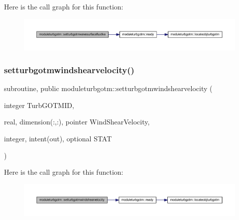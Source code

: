 Here is the call graph for this function\+:\nopagebreak
\begin{figure}[H]
\begin{center}
\leavevmode
\includegraphics[width=350pt]{namespacemoduleturbgotm_a868b912c54f8467afdf5608913e56f87_cgraph}
\end{center}
\end{figure}
\mbox{\label{namespacemoduleturbgotm_acbaf0e58ab0ad4a29aca5101ed59bdea}} 
\subsubsection{\texorpdfstring{setturbgotmwindshearvelocity()}{setturbgotmwindshearvelocity()}}
{\footnotesize\ttfamily subroutine, public moduleturbgotm\+::setturbgotmwindshearvelocity (\begin{DoxyParamCaption}\item[{integer}]{Turb\+G\+O\+T\+M\+ID,  }\item[{real, dimension(\+:,\+:), pointer}]{Wind\+Shear\+Velocity,  }\item[{integer, intent(out), optional}]{S\+T\+AT }\end{DoxyParamCaption})}

Here is the call graph for this function\+:\nopagebreak
\begin{figure}[H]
\begin{center}
\leavevmode
\includegraphics[width=350pt]{namespacemoduleturbgotm_acbaf0e58ab0ad4a29aca5101ed59bdea_cgraph}
\end{center}
\end{figure}
\mbox{\label{namespacemoduleturbgotm_ade6cfc34dc78769397885a40df0e608b}} 
